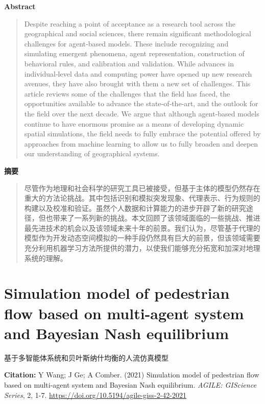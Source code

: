 \vspace{1.5em}
\noindent\textbf{Abstract}\par
\begin{quote}\small
Despite reaching a point of acceptance as a research tool across the geographical and social sciences, there remain significant methodological challenges for agent‐based models. These include recognizing and simulating emergent phenomena, agent representation, construction of behavioral rules, and calibration and validation. While advances in individual‐level data and computing power have opened up new research avenues, they have also brought with them a new set of challenges. This article reviews some of the challenges that the field has faced, the opportunities available to advance the state‐of‐the‐art, and the outlook for the field over the next decade. We argue that although agent‐based models continue to have enormous promise as a means of developing dynamic spatial simulations, the field needs to fully embrace the potential offered by approaches from machine learning to allow us to fully broaden and deepen our understanding of geographical systems.
\end{quote}

\noindent\textbf{摘要}\par
\begin{quote}\small
尽管作为地理和社会科学的研究工具已被接受，但基于主体的模型仍然存在重大的方法论挑战。其中包括识别和模拟突发现象、代理表示、行为规则的构建以及校准和验证。虽然个人数据和计算能力的进步开辟了新的研究途径，但也带来了一系列新的挑战。本文回顾了该领域面临的一些挑战、推进最先进技术的机会以及该领域未来十年的前景。我们认为，尽管基于代理的模型作为开发动态空间模拟的一种手段仍然具有巨大的前景，但该领域需要充分利用机器学习方法所提供的潜力，以使我们能够充分拓宽和加深对地理系统的理解。
\end{quote}

\vspace{0.5em}
\chapter{Simulation model of pedestrian flow based on multi-agent system and Bayesian Nash equilibrium}
\begin{center}\small 基于多智能体系统和贝叶斯纳什均衡的人流仿真模型\end{center}

\noindent\textbf{Citation:} Y Wang; J Ge; A Comber. (2021) Simulation model of pedestrian flow based on multi-agent system and Bayesian Nash equilibrium. \textit{AGILE: GIScience Series}, 2, 1-7. \url{https://doi.org/10.5194/agile-giss-2-42-2021}

